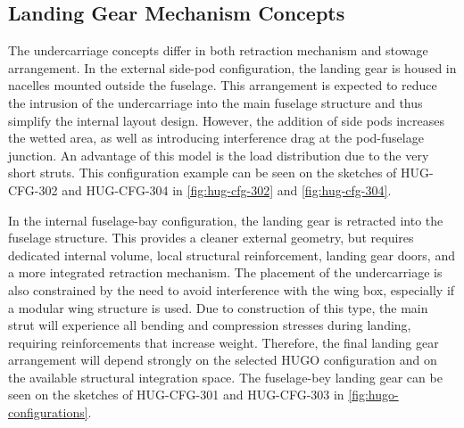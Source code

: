 \subsection{Landing Gear Mechanism Concepts}
\label{sub:landing_gear_mechanisms}
The undercarriage concepts differ in both retraction mechanism and stowage arrangement. In the external side-pod configuration, the landing gear is housed in nacelles mounted outside the fuselage. This arrangement is expected to reduce the intrusion of the undercarriage into the main fuselage structure and thus simplify the internal layout design. However, the addition of side pods increases the wetted area, as well as introducing interference drag at the pod-fuselage junction. An advantage of this model is the load distribution due to the very short struts. This configuration example can be seen on the sketches of HUG-CFG-302 and HUG-CFG-304 in \autoref{fig:hug-cfg-302} and \autoref{fig:hug-cfg-304}.

In the internal fuselage-bay configuration, the landing gear is retracted into the fuselage structure. This provides a cleaner external geometry, but requires dedicated internal volume, local structural reinforcement, landing gear doors, and a more integrated retraction mechanism. The placement of the undercarriage is also constrained by the need to avoid interference with the wing box, especially if a modular wing structure is used. Due to construction of this type, the main strut will experience all bending and compression stresses during landing, requiring reinforcements that increase weight. Therefore, the final landing gear arrangement will depend strongly on the selected HUGO configuration and on the available structural integration space. The fuselage-bey landing gear can be seen on the sketches of HUG-CFG-301 and HUG-CFG-303 in \autoref{fig:hugo-configurations}.



